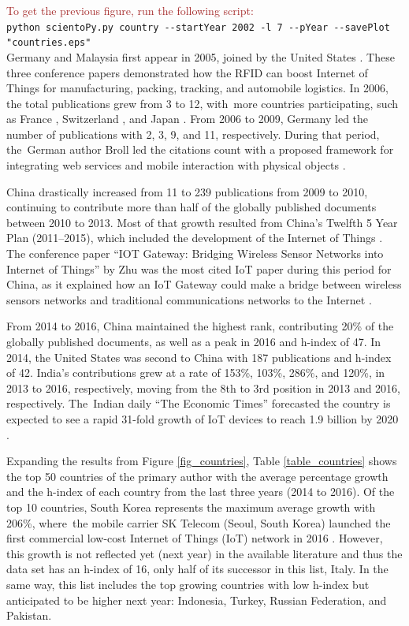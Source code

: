 \documentclass[symmetry,article,accept,moreauthors,pdftex10pt,a4paper]{mdpi}
\begin{document}
\noindent
\textcolor{brown}{To get the previous figure, run the following script:}\\
\hspace*{0.5cm}\verb|python scientoPy.py country --startYear 2002 -l 7 --pYear --savePlot "countries.eps"|\\

Germany \cite{Bose2005} and Malaysia \cite{Norman2005} first appear in 2005, joined by the United States  \cite{Djassemi2005}. These three conference papers demonstrated how the RFID can boost Internet of Things for manufacturing, packing, tracking, and automobile logistics. In 2006, the total publications grew from 3 to 12, with~more countries participating, such as France \cite{4022056,1698342}, Switzerland \cite{Adelmann2006366,Lehtonen200677}, and Japan \cite{Futatsumori2006258}. From 2006 to 2009, Germany led the number of publications with 2, 3, 9, and 11, respectively. During that period, the~German author Broll led the citations count with a proposed framework for integrating web services and mobile interaction with physical objects \cite{5262929}.

China drastically increased from 11 to 239 publications from 2009 to 2010, continuing to contribute more than half of the globally published documents between 2010 to 2013. Most of that growth resulted from China's Twelfth 5 Year Plan (2011--2015), which included the development of the Internet of Things \cite{ISI:000304905300012}. The conference paper ``IOT Gateway: Bridging Wireless Sensor Networks into Internet of Things'' by Zhu was the most
cited IoT paper during this period for China, as it explained how an IoT Gateway could make a bridge between wireless sensors networks and traditional communications networks to the Internet \cite{Zhu2010347}.

From 2014 to 2016, China maintained the highest rank, contributing 20\% of the globally published documents, as well as a peak in 2016 and h-index of 47. In 2014, the United States was second to China with 187 publications and h-index of 42. India's contributions grew at a rate of 153\%, 103\%, 286\%, and 120\%, in 2013 to 2016, respectively, moving from the 8th to 3rd position in 2013 and 2016, respectively. The~Indian daily ``The Economic Times'' forecasted the country is expected to see a rapid 31-fold growth of IoT devices to reach 1.9 billion by 2020 \cite{theEconomicTimes2017}. 


Expanding the results from Figure \ref{fig_countries}, Table \ref{table_countries} shows the top 50 countries of the primary author with the average percentage growth and the h-index of each country from the last three years (2014 to 2016). Of the top 10 countries, South Korea represents the maximum average growth with 206\%, where~the mobile carrier SK Telecom (Seoul, South Korea) launched the first commercial low-cost Internet of Things (IoT) network in 2016 \cite{bbcKorea2016}. However, this growth is not reflected yet (next year) in the available literature and thus the data set has an h-index of 16, only half of its successor in this list, Italy. In the same way, this list includes the top growing countries with low h-index but anticipated to be higher next year: Indonesia, Turkey, Russian Federation, and Pakistan.
\end{document}
